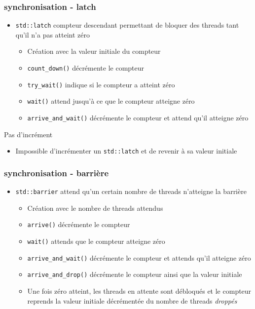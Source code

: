 \documentclass[C++.tex]{subfiles}
\begin{document}
\begin{frame}[fragile]
	\frametitle{synchronisation - latch}


	\begin{itemize}
		\item \lstinline|std::latch| compteur descendant permettant de bloquer des threads tant qu'il n'a pas atteint zéro 
		\begin{itemize}
			\item Création avec la valeur initiale du compteur
			\item \lstinline|count_down()| décrémente le compteur
			\item \lstinline|try_wait()| indique si le compteur a atteint zéro
			\item \lstinline|wait()| attend jusqu'à ce que le compteur atteigne zéro
			\item \lstinline|arrive_and_wait()| décrémente le compteur et attend qu'il atteigne zéro
		\end{itemize}
	\end{itemize}

	\begin{alertblock}{Pas d'incrément}
		\begin{itemize}
			\item Impossible d'incrémenter un \lstinline|std::latch| et de revenir à sa valeur initiale
		\end{itemize}
	\end{alertblock}
\end{frame}

\begin{frame}[fragile]
	\frametitle{synchronisation - barrière}
	\begin{itemize}
		\item \lstinline|std::barrier| attend qu'un certain nombre de threads n'atteigne la barrière
		\begin{itemize}
			\item Création avec le nombre de threads attendus
			\item \lstinline|arrive()| décrémente le compteur
			\item \lstinline|wait()| attends que le compteur atteigne zéro
			\item \lstinline|arrive_and_wait()| décrémente le compteur et attends qu'il atteigne zéro
			\item \lstinline|arrive_and_drop()| décrémente le compteur ainsi que la valeur initiale
			\item Une fois zéro atteint, les threads en attente sont débloqués et le compteur reprends la valeur initiale décrémentée du nombre de threads \og \textit{droppés}\fg{}
		\end{itemize}
	\end{itemize}
\end{frame}
\end{document}
